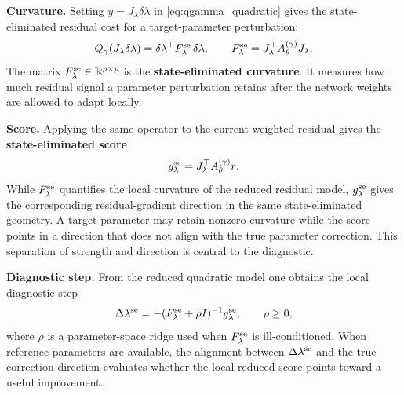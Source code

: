 \documentclass[preprint,12pt]{elsarticle}
\newcommand{\R}{\mathbb{R}}
\begin{document}
\medskip\noindent
\textbf{Curvature.}
Setting $y = J_\lambda\delta\lambda$ in \eqref{eq:qgamma_quadratic} gives the state-eliminated residual cost for a target-parameter perturbation:
\begin{equation}
    Q_\gamma(J_\lambda\delta\lambda)
    = \delta\lambda^\top F_\lambda^{\rm se}\,\delta\lambda,
    \qquad
    F_\lambda^{\rm se}=J_\lambda^\top A_\theta^{(\gamma)} J_\lambda .
    \label{eq:A_curvature}
\end{equation}
The matrix $F_\lambda^{\rm se}\in\R^{p\times p}$ is the \textbf{state-eliminated curvature}.  It measures how much residual signal a parameter perturbation retains after the network weights are allowed to adapt locally.

\medskip\noindent
\textbf{Score.}
Applying the same operator to the current weighted residual gives the \textbf{state-eliminated score}
\begin{equation}
    g_\lambda^{\rm se}=J_\lambda^\top A_\theta^{(\gamma)}\bar r .
    \label{eq:A_score}
\end{equation}
While $F_\lambda^{\rm se}$ quantifies the local curvature of the reduced residual model, $g_\lambda^{\rm se}$ gives the corresponding residual-gradient direction in the same state-eliminated geometry.  A target parameter may retain nonzero curvature while the score points in a direction that does not align with the true parameter correction.  This separation of strength and direction is central to the diagnostic.

\medskip\noindent
\textbf{Diagnostic step.}
From the reduced quadratic model one obtains the local diagnostic step
\begin{equation}
    \Delta\lambda^{\rm se}=-(F_\lambda^{\rm se}+\rho I)^{-1}g_\lambda^{\rm se},
    \qquad \rho\ge 0,
    \label{eq:diagnostic_step}
\end{equation}
where $\rho$ is a parameter-space ridge used when $F_\lambda^{\rm se}$ is ill-conditioned.  When reference parameters are available, the alignment between $\Delta\lambda^{\rm se}$ and the true correction direction evaluates whether the local reduced score points toward a useful improvement.
\end{document}
